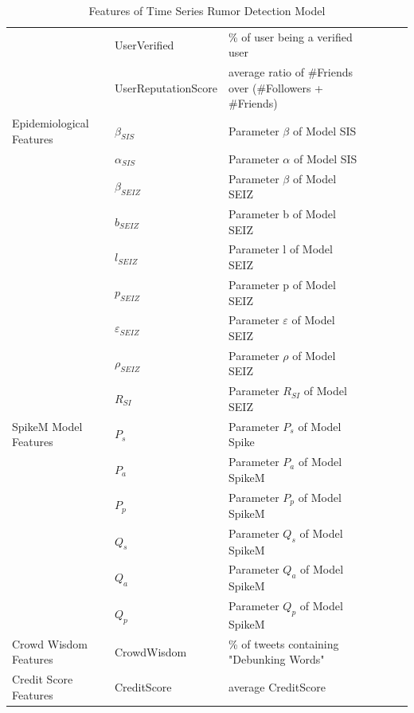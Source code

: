 \begin{table}[!h]
{\begin{tabular}{@{}lllllll@{}}
\\
 	& UserVerified  & \% of user being a verified user\cite{yang2012automatic}\cite{liu2015real}
\\
 	& UserReputationScore & average ratio of \#Friends over (\#Followers + \#Friends) \cite{liu2015real}\\   \midrule
 Epidemiological Features & $\beta_{SIS}$ & Parameter $\beta$ of Model SIS \cite{jin2013epidemiological}\\
 							& $\alpha_{SIS} $ & Parameter $\alpha$ of Model SIS \cite{jin2013epidemiological}\\
 							& $\beta_{SEIZ}$ & Parameter $\beta$ of Model SEIZ \cite{jin2013epidemiological}\\
 							& $b_{SEIZ}$ & Parameter b of Model SEIZ\cite{jin2013epidemiological}\\
 							& $l_{SEIZ}$ & Parameter l of Model SEIZ \cite{jin2013epidemiological}\\
 							& $p_{SEIZ}$ & Parameter p of Model SEIZ \cite{jin2013epidemiological}\\
 							& $\varepsilon_{SEIZ}$ & Parameter $\varepsilon$ of Model SEIZ \cite{jin2013epidemiological}\\
 							& $\rho_{SEIZ}$ & Parameter $\rho$ of Model SEIZ \cite{jin2013epidemiological}\\
 							& $R_{SI}$ & Parameter $R_{SI}$ of Model SEIZ \cite{jin2013epidemiological}\\
		\midrule	
 SpikeM Model Features & $P_s$ & Parameter $P_s$ of Model Spike \cite{kwon2013prominent}\\
 							& $P_a$ & Parameter $P_a$ of Model SpikeM \cite{kwon2013prominent}\\
 							& $P_p$ & Parameter $P_p$ of Model SpikeM \cite{kwon2013prominent}\\
 							& $Q_s$  & Parameter $Q_s$ of Model SpikeM \cite{kwon2013prominent}\\
 							& $Q_a$ & Parameter $Q_a$ of Model SpikeM \cite{kwon2013prominent}\\
 							& $Q_p$ & Parameter $Q_p$ of Model SpikeM \cite{kwon2013prominent}\\ \midrule	
 Crowd Wisdom Features & CrowdWisdom & \% of tweets containing "Debunking Words" \cite{liu2015real} \cite{zhao2015enquiring}\\ \midrule
 Credit Score Features & CreditScore & average CreditScore\\
 \bottomrule
 \end{tabular}}
 \caption{Features of Time Series Rumor Detection Model}
 \label{tab:full_features}
\end{table}
\clearpage
